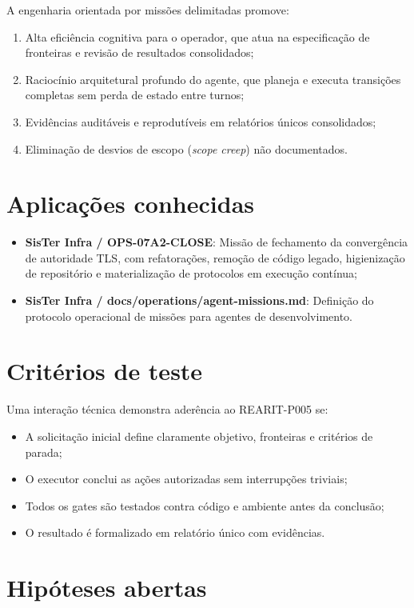 A engenharia orientada por missões delimitadas promove:
\begin{enumerate}
  \item Alta eficiência cognitiva para o operador, que atua na especificação de
    fronteiras e revisão de resultados consolidados;
  \item Raciocínio arquitetural profundo do agente, que planeja e executa
    transições completas sem perda de estado entre turnos;
  \item Evidências auditáveis e reprodutíveis em relatórios únicos consolidados;
  \item Eliminação de desvios de escopo (\textit{scope creep}) não documentados.
\end{enumerate}

\section{Aplicações conhecidas}

\begin{itemize}
  \item \textbf{SisTer Infra / OPS-07A2-CLOSE}: Missão de fechamento da
    convergência de autoridade TLS, com refatorações, remoção de código legado,
    higienização de repositório e materialização de protocolos em execução contínua;
  \item \textbf{SisTer Infra / docs/operations/agent-missions.md}: Definição do
    protocolo operacional de missões para agentes de desenvolvimento.
\end{itemize}

\section{Critérios de teste}

Uma interação técnica demonstra aderência ao REARIT-P005 se:
\begin{itemize}
  \item A solicitação inicial define claramente objetivo, fronteiras e critérios
    de parada;
  \item O executor conclui as ações autorizadas sem interrupções triviais;
  \item Todos os gates são testados contra código e ambiente antes da conclusão;
  \item O resultado é formalizado em relatório único com evidências.
\end{itemize}

\section{Hipóteses abertas}


